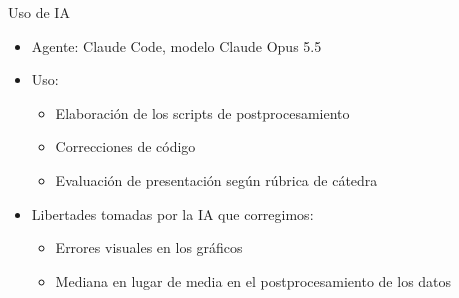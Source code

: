 \begin{frame}{Uso de IA}
  \begin{itemize}\setlength{\itemsep}{8pt}
    \item Agente: Claude Code, modelo Claude Opus 5.5
    \item Uso:
      \begin{itemize}
        \item Elaboración de los scripts de postprocesamiento
        \item Correcciones de código
        \item Evaluación de presentación según rúbrica de cátedra
      \end{itemize}
    \item Libertades tomadas por la IA que corregimos:
      \begin{itemize}
        \item Errores visuales en los gráficos
        \item Mediana en lugar de media en el postprocesamiento de los datos
      \end{itemize}
  \end{itemize}
\end{frame}
